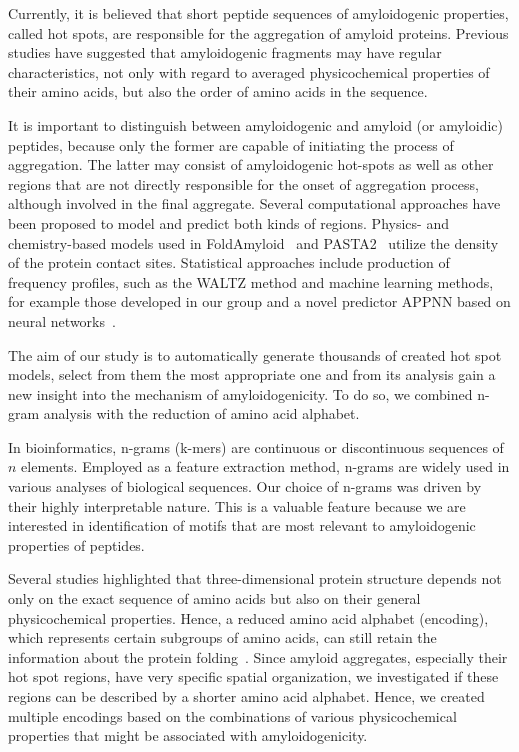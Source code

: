 \documentclass[fleqn,10pt,twoside]{gcb15submission}
\begin{document}
  Currently, it is believed that short peptide sequences of amyloidogenic 
properties, called hot spots, are responsible for the aggregation of amyloid 
proteins. Previous studies have suggested that amyloidogenic fragments may have 
regular characteristics, not only with regard to averaged physicochemical 
properties of their amino acids, but also the order of amino acids in the 
sequence. 

  It is important to distinguish between amyloidogenic and amyloid (or 
amyloidic) peptides, because only the former are capable of initiating the 
process of aggregation. The latter may consist of amyloidogenic hot-spots as 
well as other regions that are not directly responsible for the onset of 
aggregation process, although involved in the final aggregate. Several 
computational approaches have been proposed to model and predict both kinds of 
regions. Physics- and chemistry-based models used in  
FoldAmyloid~\citep{garbuzynskiy_foldamyloid:_2010} and 
PASTA2~\citep{walsh_pasta_2014} utilize the density of the protein contact 
sites. 
Statistical approaches include production of frequency profiles, such as the 
WALTZ method \citep{maurer-stroh_exploring_2010} and machine learning methods, 
for example those developed in our group \citep{gasior_fish_2014} and a novel 
predictor APPNN based on neural networks~\citep{familia_prediction_2015}. 
  
  The aim of our study is to automatically generate thousands of created hot 
spot models, select from them the most appropriate one and from its analysis 
gain a new insight into the mechanism of amyloidogenicity. To do so, we combined 
n-gram analysis with the reduction of amino acid alphabet.
  
  In bioinformatics, n-grams (k-mers) are continuous or discontinuous sequences 
of $n$ elements. Employed as a feature extraction method, n-grams are widely 
used in various analyses of biological sequences. Our choice of n-grams was driven by 
their highly interpretable nature. This is a valuable feature because we are 
interested in identification of motifs that are most relevant to amyloidogenic 
properties of peptides.

  Several studies highlighted that three-dimensional protein structure depends 
not only on the exact sequence of amino acids but also on their general 
physicochemical properties. Hence, a reduced amino acid alphabet (encoding), 
which represents certain subgroups of amino acids, can still retain the 
information about the protein folding~\citep{murphy_simplified_2000}. Since 
amyloid aggregates, especially their hot spot regions, have very specific 
spatial organization, we investigated if these regions can be described by a 
shorter amino acid alphabet. Hence, we created multiple encodings based on the 
combinations of various physicochemical properties that might be associated with 
amyloidogenicity.  
\end{document}
